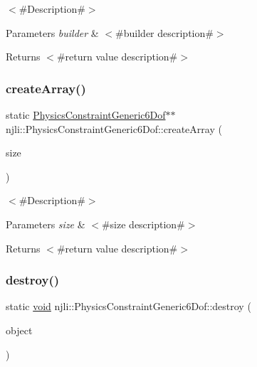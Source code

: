 $<$\#\+Description\#$>$


\begin{DoxyParams}{Parameters}
{\em builder} & $<$\#builder description\#$>$\\
\hline
\end{DoxyParams}
\begin{DoxyReturn}{Returns}
$<$\#return value description\#$>$ 
\end{DoxyReturn}
\mbox{\label{classnjli_1_1_physics_constraint_generic6_dof_a381a2088b01e0250c34d2da797df64aa}} 
\subsubsection{\texorpdfstring{create\+Array()}{createArray()}}
{\footnotesize\ttfamily static \mbox{\hyperlink{classnjli_1_1_physics_constraint_generic6_dof}{Physics\+Constraint\+Generic6\+Dof}}$\ast$$\ast$ njli\+::\+Physics\+Constraint\+Generic6\+Dof\+::create\+Array (\begin{DoxyParamCaption}\item[{const \mbox{\hyperlink{_util_8h_a10e94b422ef0c20dcdec20d31a1f5049}{u32}}}]{size }\end{DoxyParamCaption})\hspace{0.3cm}{\ttfamily [static]}}

$<$\#\+Description\#$>$


\begin{DoxyParams}{Parameters}
{\em size} & $<$\#size description\#$>$\\
\hline
\end{DoxyParams}
\begin{DoxyReturn}{Returns}
$<$\#return value description\#$>$ 
\end{DoxyReturn}
\mbox{\label{classnjli_1_1_physics_constraint_generic6_dof_a9284dc403064bdfbc2cee6a713b070c4}} 
\subsubsection{\texorpdfstring{destroy()}{destroy()}}
{\footnotesize\ttfamily static \mbox{\hyperlink{_thread_8h_af1e856da2e658414cb2456cb6f7ebc66}{void}} njli\+::\+Physics\+Constraint\+Generic6\+Dof\+::destroy (\begin{DoxyParamCaption}\item[{\mbox{\hyperlink{classnjli_1_1_physics_constraint_generic6_dof}{Physics\+Constraint\+Generic6\+Dof}} $\ast$}]{object }\end{DoxyParamCaption})\hspace{0.3cm}{\ttfamily [static]}}

